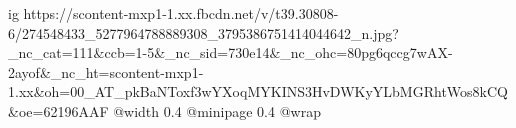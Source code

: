  
 
 
 
 

\ifcmt
  ig https://scontent-mxp1-1.xx.fbcdn.net/v/t39.30808-6/274548433_5277964788889308_3795386751414044642_n.jpg?_nc_cat=111&ccb=1-5&_nc_sid=730e14&_nc_ohc=80pg6qccg7wAX-2ayof&_nc_ht=scontent-mxp1-1.xx&oh=00_AT_pkBaNToxf3wYXoqMYKINS3HvDWKyYLbMGRhtWos8kCQ&oe=62196AAF
  @width 0.4
  @minipage 0.4
  @wrap \parpic[r]
\fi
